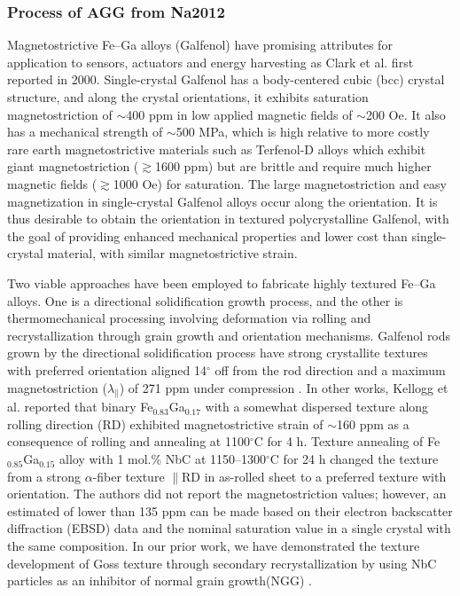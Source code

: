 
\subsubsection{Process of AGG from Na2012 \cite{Na2012b} }


Magnetostrictive Fe–Ga alloys (Galfenol) have promising attributes for application to sensors, actuators and energy harvesting as Clark et al. first reported in 2000\cite{clark2000magnetostrictive}. Single-crystal Galfenol has a body-centered
cubic (bcc) crystal structure, and along the  crystal orientations, it exhibits saturation magnetostriction of $\sim$400 ppm in low applied magnetic fields of $\sim$200 Oe. It also has a mechanical strength of $\sim$500 MPa, which is high relative to more costly rare earth magnetostrictive materials such as Terfenol-D alloys which exhibit giant magnetostriction ($\gtrsim$1600 ppm) but are brittle and require much higher magnetic fields ($\gtrsim$1000 Oe) for saturation\cite{clark2000magnetostrictive,Clark2003,Guruswamy2000}. The large magnetostriction and easy magnetization in single-crystal Galfenol alloys occur along the  orientation. It is thus desirable to obtain the  orientation in textured polycrystalline Galfenol, with the goal of providing enhanced mechanical properties and lower cost than single-crystal material, with similar magnetostrictive strain. 

Two viable approaches have been employed to fabricate highly textured Fe–Ga alloys\cite{srisukhumbowornchai2001large,kellogg2003texture}. One is a directional solidification growth process, and the other is thermomechanical processing involving deformation via rolling and recrystallization through grain growth and orientation mechanisms. Galfenol rods grown by the directional solidification process have strong crystallite textures with  preferred orientation aligned 14$^{\circ}$ off from the rod direction and a maximum magnetostriction ($\lambda_{\parallel}$) of 271 ppm under compression \cite{srisukhumbowornchai2001large}. In other works, Kellogg et al. reported that binary Fe$_{0.83}$Ga$_{0.17}$ with a somewhat dispersed  texture along rolling direction (RD) exhibited magnetostrictive strain of $\sim$160 ppm as a consequence of rolling and annealing at 1100$^{\circ}$C for 4 h\cite{kellogg2003texture}. Texture annealing of Fe$_{0.85}$Ga$_{0.15}$ alloy with 1 mol.\% NbC at 1150–1300$^{\circ}$C for 24 h changed the texture from a strong $\alpha$-fiber texture $\parallel$RD in as-rolled sheet to a preferred texture with  orientation\cite{srisukhumbowornchai2004crystallographic}. The authors did not report the magnetostriction values; however, an estimated of lower than 135 ppm can be made based on their electron backscatter diffraction (EBSD) data and the nominal saturation value in a single crystal with the same composition. In our prior work, we have demonstrated the texture development of Goss  texture through secondary recrystallization by using NbC particles as an inhibitor of normal grain growth(NGG) \cite{Na2009}.

